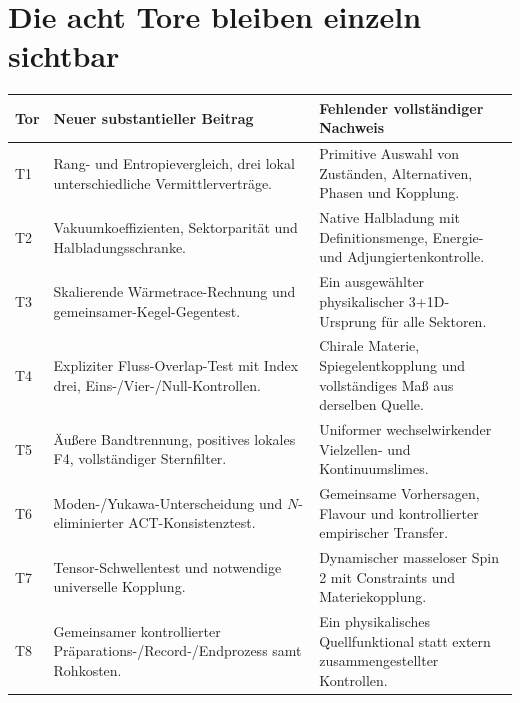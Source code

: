 \section{Die acht Tore bleiben einzeln sichtbar}
\begin{longtable}{L{10mm}L{65mm}L{72mm}}
\toprule Tor&Neuer substantieller Beitrag&Fehlender vollständiger Nachweis\\\midrule\endhead
T1&Rang- und Entropievergleich, drei lokal unterschiedliche Vermittlerverträge.&Primitive Auswahl von Zuständen, Alternativen, Phasen und Kopplung.\\
T2&Vakuumkoeffizienten, Sektorparität und Halbladungsschranke.&Native Halbladung mit Definitionsmenge, Energie- und Adjungiertenkontrolle.\\
T3&Skalierende Wärmetrace-Rechnung und gemeinsamer-Kegel-Gegentest.&Ein ausgewählter physikalischer 3+1D-Ursprung für alle Sektoren.\\
T4&Expliziter Fluss-Overlap-Test mit Index drei, Eins-/Vier-/Null-Kontrollen.&Chirale Materie, Spiegelentkopplung und vollständiges Maß aus derselben Quelle.\\
T5&Äußere Bandtrennung, positives lokales F4, vollständiger Sternfilter.&Uniformer wechselwirkender Vielzellen- und Kontinuumslimes.\\
T6&Moden-/Yukawa-Unterscheidung und $N$-eliminierter ACT-Konsistenztest.&Gemeinsame Vorhersagen, Flavour und kontrollierter empirischer Transfer.\\
T7&Tensor-Schwellentest und notwendige universelle Kopplung.&Dynamischer masseloser Spin 2 mit Constraints und Materiekopplung.\\
T8&Gemeinsamer kontrollierter Präparations-/Record-/Endprozess samt Rohkosten.&Ein physikalisches Quellfunktional statt extern zusammengestellter Kontrollen.\\\bottomrule
\end{longtable}

